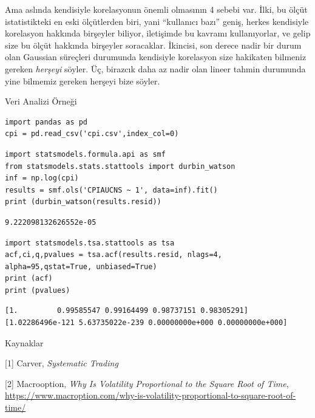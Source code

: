 \documentclass[12pt,fleqn]{article}\usepackage{../../common}
\begin{document}
Ama aslında kendisiyle korelasyonun önemli olmasının 4 sebebi var. İlki, bu
ölçüt istatistikteki en eski ölçütlerden biri, yani ``kullanıcı bazı'' geniş,
herkes kendisiyle korelasyon hakkında birşeyler biliyor, iletişimde bu kavramı
kullanıyorlar, ve gelip size bu ölçüt hakkında birşeyler soracaklar. İkincisi,
son derece nadir bir durum olan Gaussian süreçleri durumunda kendisiyle
korelasyon size hakikaten bilmeniz gereken {\em herşeyi} söyler. Üç, birazcık
daha az nadir olan lineer tahmin durumunda yine bilmemiz gereken herşeyi bize
söyler. 

Veri Analizi Örneği

\begin{verbatim}
import pandas as pd
cpi = pd.read_csv('cpi.csv',index_col=0)
\end{verbatim}

\begin{verbatim}
import statsmodels.formula.api as smf
from statsmodels.stats.stattools import durbin_watson
inf = np.log(cpi)
results = smf.ols('CPIAUCNS ~ 1', data=inf).fit()
print (durbin_watson(results.resid))
\end{verbatim}

\begin{verbatim}
9.222098132626552e-05
\end{verbatim}

\begin{verbatim}
import statsmodels.tsa.stattools as tsa
acf,ci,q,pvalues = tsa.acf(results.resid, nlags=4, alpha=95,qstat=True, unbiased=True)
print (acf)
print (pvalues)
\end{verbatim}

\begin{verbatim}
[1.         0.99585547 0.99164499 0.98737151 0.98305291]
[1.02286496e-121 5.63735022e-239 0.00000000e+000 0.00000000e+000]
\end{verbatim}






Kaynaklar

[1] Carver, {\em Systematic Trading}

[2] Macrooption, {\em Why Is Volatility Proportional to the Square Root of  Time},
    \url{https://www.macroption.com/why-is-volatility-proportional-to-square-root-of-time/}
\end{document}
